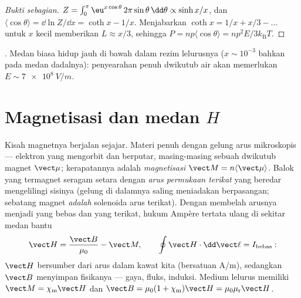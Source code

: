 \begin{proof}[Bukti sebagian]
$Z = \int_0^\pi \eu^{x\cos\theta}\,2\pi\sin\theta\,\dd\theta \propto
\sinh x/x$, dan $\langle\cos\theta\rangle = \dd\ln Z/\dd x = \coth x
- 1/x$. Menjabarkan $\coth x = 1/x + x/3 - \dots$ untuk $x$ kecil memberikan
$L \approx x/3$, sehingga $P = np\langle\cos\theta\rangle =
np^2E/3k_{\text{B}}T$.
\end{proof}

\begin{omfigure}

{\small {}. Medan biasa hidup jauh di bawah dalam
rezim lelurusnya ($x \sim 10^{-3}$ bahkan pada medan dadalnya):
penyearahan penuh dwikutub air akan memerlukan
$E \sim \qty{7e8}{V/m}$.}
\end{omfigure}

\section{Magnetisasi dan medan \texorpdfstring{$H$}{H}}

\begin{definition}\label{def:b3:electromagnetism-in-matter:magnetisation}
Kisah magnetnya berjalan sejajar. Materi penuh dengan gelung arus
mikroskopis --- elektron yang mengorbit dan berputar, masing-masing sebuah
dwikutub magnet $\vect\mu$; kerapatannya adalah \emph{magnetisasi}
$\vect M = n\langle\vect\mu\rangle$. Balok yang termagnet seragam setara
dengan \emph{arus permukaan terikat} yang beredar mengelilingi
sisinya (gelung di dalamnya saling meniadakan berpasangan; sebatang
magnet \emph{adalah} solenoida arus terikat). Dengan membelah arusnya
menjadi yang bebas dan yang terikat, hukum Ampère tertata ulang di
sekitar medan bantu
\[
\vect H = \frac{\vect B}{\mu_0} - \vect M , \qquad
\oint \vect H\cdot\dd\vect\ell = I_{\text{bebas}} :
\]
$\vect H$ bersumber dari arus dalam kawat kita (bersatuan
\unit{A/m}), sedangkan $\vect B$ menyimpan fisikanya --- gaya, fluks,
induksi. Medium lelurus memiliki $\vect M = \chi_{\text{m}}\vect H$ dan
$\vect B = \mu_0(1 + \chi_{\text{m}})\vect H =
\mu_0\mu_{\text{r}}\vect H$.
\end{definition}

